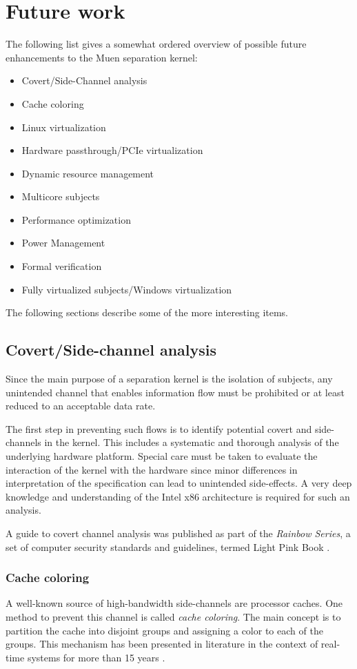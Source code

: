 \section{Future work}
The following list gives a somewhat ordered overview of possible future
enhancements to the Muen separation kernel:

\begin{itemize}
	\item Covert/Side-Channel analysis
	\item Cache coloring
	\item Linux virtualization
	\item Hardware passthrough/PCIe virtualization
	\item Dynamic resource management
	\item Multicore subjects
	\item Performance optimization
	\item Power Management
	\item Formal verification
	\item Fully virtualized subjects/Windows virtualization
\end{itemize}

The following sections describe some of the more interesting items.

\subsection{Covert/Side-channel analysis}
Since the main purpose of a separation kernel is the isolation of subjects, any
unintended channel that enables information flow must be prohibited or at least
reduced to an acceptable data rate.

The first step in preventing such flows is to identify potential covert and
side-channels in the kernel. This includes a systematic and thorough analysis of
the underlying hardware platform. Special care must be taken to evaluate the
interaction of the kernel with the hardware since minor differences in
interpretation of the specification can lead to unintended side-effects. A very
deep knowledge and understanding of the Intel x86 architecture is required for
such an analysis.

A guide to covert channel analysis was published as part of the
\emph{Rainbow Series}, a set of computer security standards and guidelines,
termed Light Pink Book \cite{LightPinkBook}.

\subsubsection{Cache coloring}
A well-known source of high-bandwidth side-channels are processor caches. One
method to prevent this channel is called \emph{cache coloring}. The main concept
is to partition the cache into disjoint groups and assigning a color to each of
the groups. This mechanism has been presented in literature in the context of
real-time systems for more than 15 years \cite{Mueller:1995:CSS:216633.216677}
\cite{Liedtke:1997:OCP:523983.828369}.

